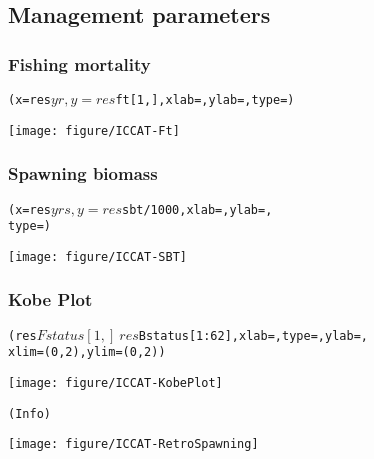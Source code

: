 
\subsection{Management parameters}
\subsubsection{Fishing mortality}
\begin{alltt}
(x = res$yr, y = res$ft[1, ], xlab = , ylab = , type = )
\end{alltt}

{\centering \texttt{[image: figure/ICCAT-Ft]} 

}





\subsubsection{Spawning biomass}
\begin{alltt}
(x = res$yrs, y = res$sbt/1000, xlab = , ylab = , 
    type = )
\end{alltt}

{\centering \texttt{[image: figure/ICCAT-SBT]} 

}



\subsubsection{Kobe Plot}
\begin{alltt}
(res$Fstatus[1, ] ~ res$Bstatus[1:62], xlab = , type = , ylab = , 
    xlim = (0, 2), ylim = (0, 2))
\end{alltt}

{\centering \texttt{[image: figure/ICCAT-KobePlot]} 

}
\begin{alltt}
(Info)
\end{alltt}

{\centering \texttt{[image: figure/ICCAT-RetroSpawning]} 

}


